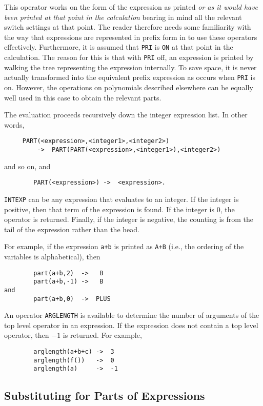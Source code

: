 This operator works on the form of the expression as printed {\em or as it
would have been printed at that point in the calculation\/} bearing in mind
all the relevant switch settings at that point.  The reader therefore
needs some familiarity with the way that expressions are represented in
prefix form in {\REDUCE} to use these operators effectively.  Furthermore,
it is assumed that {\tt PRI} is {\tt ON} at that point in the calculation.
The reason for this is that with {\tt PRI} off, an expression is printed
by walking the tree representing the expression internally.  To save
space, it is never actually transformed into the equivalent prefix
expression as occurs when {\tt PRI} is on.  However, the operations on
polynomials described elsewhere can be equally well used in this case to
obtain the relevant parts.

The evaluation proceeds recursively down the integer expression list. In
other words,
\begin{verbatim}
     PART(<expression>,<integer1>,<integer2>)
         ->  PART(PART(<expression>,<integer1>),<integer2>)
\end{verbatim}
 and so on, and
\begin{verbatim}
        PART(<expression>) ->  <expression>.
\end{verbatim}
{\tt INTEXP} can be any expression that evaluates to an integer.  If the
integer is positive, then that term of the expression is found.  If the
integer is 0, the operator is returned.  Finally, if the integer is
negative, the counting is from the tail of the expression rather than the
head.

For example, if the expression {\tt a+b} is printed as {\tt A+B} (i.e.,
the ordering of the variables is alphabetical), then
\begin{verbatim}
        part(a+b,2)  ->   B
        part(a+b,-1) ->   B
and
        part(a+b,0)  ->  PLUS
\end{verbatim}
\hypertarget{operator:ARGLENGTH}{}
An operator {\tt ARGLENGTH} is available to determine
the number of arguments of the top level operator in an expression.  If
the expression does not contain a top level operator, then $-1$ is returned.
For example,
\begin{verbatim}
        arglength(a+b+c) ->  3
        arglength(f())   ->  0
        arglength(a)     ->  -1
\end{verbatim}

\subsection{Substituting for Parts of Expressions}

